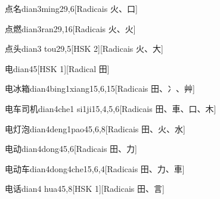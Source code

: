 \begin{entry}{点名}{dian3ming2}{9,6}[Radicais ⽕、⼝]
\end{entry}

\begin{entry}{点燃}{dian3ran2}{9,16}[Radicais ⽕、⽕]
\end{entry}

\begin{entry}{点头}{dian3 tou2}{9,5}[HSK 2][Radicais ⽕、⼤]
\end{entry}

\begin{entry}{电}{dian4}{5}[HSK 1][Radical ⽥]
\end{entry}

\begin{entry}{电冰箱}{dian4bing1xiang1}{5,6,15}[Radicais ⽥、⼎、⾋]
\end{entry}

\begin{entry}{电车司机}{dian4che1 si1ji1}{5,4,5,6}[Radicais ⽥、⾞、⼝、⽊]
\end{entry}

\begin{entry}{电灯泡}{dian4deng1pao4}{5,6,8}[Radicais ⽥、⽕、⽔]
\end{entry}

\begin{entry}{电动}{dian4dong4}{5,6}[Radicais ⽥、⼒]
\end{entry}

\begin{entry}{电动车}{dian4dong4che1}{5,6,4}[Radicais ⽥、⼒、⾞]
\end{entry}

\begin{entry}{电话}{dian4 hua4}{5,8}[HSK 1][Radicais ⽥、⾔]
\end{entry}

